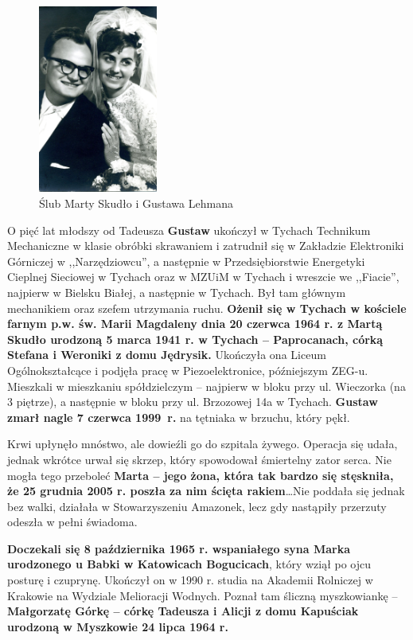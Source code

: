 \begin{figure}[!h]
\begin{center}
\includegraphics[width=0.35\textwidth]{photo/gustaw_marta_lehman_slub.jpg}
\caption{Ślub Marty Skudło i Gustawa Lehmana}
\label{rys:gustaw_marta_lehman_slub}
\end{center}
\end{figure}

O pięć lat młodszy od Tadeusza \textbf{Gustaw} ukończył w Tychach Technikum Mechaniczne w klasie obróbki skrawaniem i zatrudnił się w Zakładzie Elektroniki Górniczej w ,,Narzędziowcu'', a następnie w Przedsiębiorstwie Energetyki Cieplnej Sieciowej w Tychach oraz w MZUiM w Tychach i wreszcie we ,,Fiacie'', najpierw w Bielsku Białej, a następnie w Tychach. Był tam głównym mechanikiem oraz szefem utrzymania ruchu. \textbf{Ożenił się w Tychach w kościele farnym p.w. św. Marii Magdaleny dnia 20 czerwca 1964 r. z Martą Skudło urodzoną 5 marca 1941 r. w Tychach -- Paprocanach, córką Stefana i Weroniki z domu Jędrysik.} Ukończyła ona Liceum Ogólnokształcące i podjęła pracę w Piezoelektronice, późniejszym ZEG-u. Mieszkali w mieszkaniu spółdzielczym -- najpierw w bloku przy ul. Wieczorka (na 3 piętrze), a następnie w bloku przy ul. Brzozowej 14a w Tychach. \textbf{Gustaw zmarł nagle 7 czerwca 1999~r.} na tętniaka w brzuchu, który pękł.

Krwi upłynęło mnóstwo, ale dowieźli go do szpitala żywego. Operacja się udała, jednak wkrótce urwał się skrzep, który spowodował śmiertelny zator serca. Nie mogła tego przeboleć \textbf{Marta -- jego żona, która tak bardzo się stęskniła, że 25 grudnia 2005 r. poszła za nim ścięta rakiem}\ldots Nie poddała się jednak bez walki, działała w Stowarzyszeniu Amazonek, lecz gdy nastąpiły przerzuty odeszła w pełni świadoma.

\textbf{Doczekali się 8 października 1965 r. wspaniałego syna Marka urodzonego u Babki w Katowicach Bogucicach}, który wziął po ojcu posturę i czuprynę. Ukończył on w 1990 r. studia na Akademii Rolniczej w Krakowie na Wydziale Melioracji Wodnych. Poznał tam śliczną myszkowiankę -- \textbf{Małgorzatę Górkę -- córkę Tadeusza i Alicji z domu Kapuściak urodzoną w Myszkowie 24 lipca 1964 r.}

